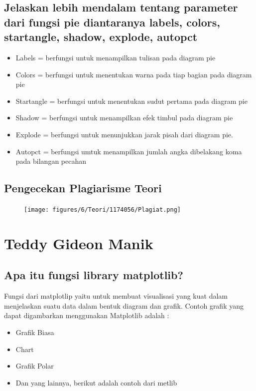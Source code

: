 \subsection{Jelaskan lebih mendalam tentang parameter dari fungsi pie diantaranya labels, colors, startangle, shadow, explode, autopct}
\begin{itemize}
    \item Labels = berfungsi untuk menampilkan tulisan pada diagram pie
    \item Colors = berfungsi untuk menentukan warna pada tiap bagian pada diagram pie
    \item Startangle = berfungsi untuk menentukan sudut pertama pada diagram pie
    \item Shadow = berfungsi untuk menampilkan efek timbul pada diagram pie
    \item Explode = berfungsi untuk menunjukkan jarak pisah dari diagram pie.
    \item Autopct = berfungsi umtuk menampilkan jumlah angka dibelakang koma pada bilangan pecahan
\end{itemize}

\subsection{Pengecekan Plagiarisme Teori}
\begin{figure}[H]
	\texttt{[image: figures/6/Teori/1174056/Plagiat.png]}
	\centering
\end{figure}

\section{Teddy Gideon Manik}
\subsection{Apa itu fungsi library matplotlib?}
Fungsi dari matplotlip yaitu untuk membuat visualisasi yang kuat dalam menjelaskan suatu data dalam bentuk diagram dan grafik. 
Contoh grafik yang dapat digambarkan menggunakan Matplotlib adalah :
\begin{itemize}
    \item Grafik Biasa 
    \item Chart
    \item Grafik Polar
    \item Dan yang lainnya, berikut adalah contoh dari metlib

\end{itemize}


